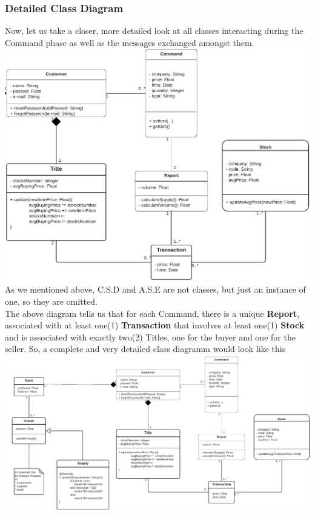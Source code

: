 \documentclass{article}
\begin{document}
\subsubsection{Detailed Class Diagram}
Now, let us take a closer, more detailed look at all classes interacting during the Command phase as well as the
messages exchanged amongst them.\\
\hspace*{25mm}\includegraphics[scale=0.3]{detailed_classes}\\
As we mentioned above, C.S.D and A.S.E are not classes, but just an instance of one, so they are omitted.\\
The above diagram tells us that for each Command, there is a unique \textbf{Report}, associated with at least one(1) \textbf{Transaction} that involves at least one(1) \textbf{Stock} and is associated with exactly two(2) Titles, one for the buyer and one for the seller.
So, a complete and very detailed class diagramm would look like this\\
\includegraphics[scale=0.25]{classes}
\end{document}
